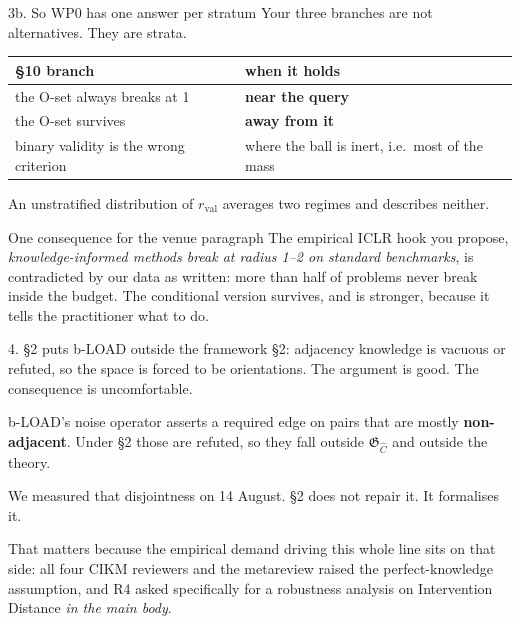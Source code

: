 \documentclass[10pt,aspectratio=169]{beamer}
\newcommand{\ok}[1]{\textcolor{good}{#1}}
\newcommand{\no}[1]{\textcolor{bad}{#1}}
\begin{document}
\begin{frame}{3b. So WP0 has one answer per stratum}
Your three branches are not alternatives. They are strata.

\begin{center}
\begin{tabular}{ll}
\toprule
\S10 branch & when it holds \\
\midrule
the O-set always breaks at 1 & \textbf{near the query} \\
the O-set survives            & \textbf{away from it} \\
binary validity is the wrong criterion & where the ball is inert, i.e.\ most of the mass \\
\bottomrule
\end{tabular}
\end{center}

\medskip
An unstratified distribution of $r_{\mathrm{val}}$ averages two regimes and describes neither.

\begin{alertblock}{One consequence for the venue paragraph}
The empirical ICLR hook you propose, \emph{knowledge-informed methods break at radius 1--2 on
standard benchmarks}, is \no{contradicted by our data as written}: more than half of problems never
break inside the budget. The \ok{conditional} version survives, and is stronger, because it tells the
practitioner what to do.
\end{alertblock}
\end{frame}

\begin{frame}{4. \S2 puts b-LOAD outside the framework}
\S2: adjacency knowledge is vacuous or refuted, so the space is forced to be orientations. The
argument is good. The consequence is uncomfortable.

\medskip
b-LOAD's noise operator asserts a required edge on pairs that are mostly \textbf{non-adjacent}. Under
\S2 those are refuted, so they fall outside $\mathfrak{G}_{\hat{C}}$ and outside the theory.

\medskip
We measured that disjointness on 14 August. \no{\S2 does not repair it. It formalises it.}

\medskip
That matters because the empirical demand driving this whole line sits on that side: all four CIKM
reviewers and the metareview raised the perfect-knowledge assumption, and R4 asked specifically for a
robustness analysis on Intervention Distance \emph{in the main body}.
\end{frame}
\end{document}
